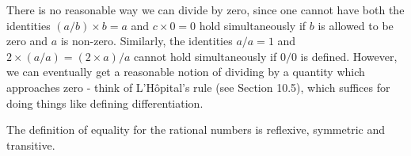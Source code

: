 \begin{note}
There is no reasonable way we can divide by zero, since one cannot have both the identities \((a / b) \times b = a\) and \(c \times 0 = 0\) hold simultaneously if \(b\) is allowed to be zero and \(a\) is non-zero.
Similarly, the identities \(a / a = 1\) and \(2 \times (a / a) = (2 \times a) / a\) cannot hold simultaneously if \(0 / 0\) is defined.
However, we can eventually get a reasonable notion of dividing by a quantity which approaches zero
- think of L'H\^opital's rule (see Section 10.5), which suffices for doing things like defining differentiation.
\end{note}

\begin{additional corollary}\label{ac 4.2.1}
The definition of equality for the rational numbers is reflexive, symmetric and transitive.
\end{additional corollary}

